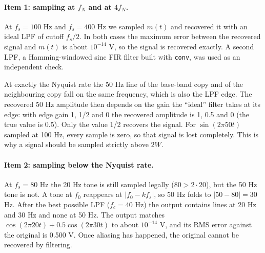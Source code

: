 \documentclass[a4paper]{article}
\begin{document}
\paragraph{Item 1: sampling at $f_N$ and at $4f_N$.}
At $f_s=100$ Hz and $f_s=400$ Hz we sampled $m(t)$ and recovered it with an ideal LPF of cutoff $f_s/2$. In both cases the maximum error between the recovered signal and $m(t)$ is about $10^{-14}$ V, so the signal is recovered exactly. A second LPF, a Hamming-windowed sinc FIR filter built with \texttt{conv}, was used as an independent check.


At exactly the Nyquist rate the 50 Hz line of the base-band copy and of the neighbouring copy fall on the same frequency, which is also the LPF edge. The recovered 50 Hz amplitude then depends on the gain the ``ideal'' filter takes at its edge: with edge gain 1, 1/2 and 0 the recovered amplitude is 1, 0.5 and 0 (the true value is 0.5). Only the value 1/2 recovers the signal. For $\sin(2\pi 50t)$ sampled at 100 Hz, every sample is zero, so that signal is lost completely. This is why a signal should be sampled strictly above $2W$.


\paragraph{Item 2: sampling below the Nyquist rate.}
At $f_s=80$ Hz the 20 Hz tone is still sampled legally ($80>2\cdot 20$), but the 50 Hz tone is not. A tone at $f_0$ reappears at $|f_0-kf_s|$, so 50 Hz folds to $|50-80|=30$ Hz. After the best possible LPF ($f_c=40$ Hz) the output contains lines at 20 Hz and 30 Hz and none at 50 Hz. The output matches $\cos(2\pi 20t)+0.5\cos(2\pi 30t)$ to about $10^{-14}$ V, and its RMS error against the original is 0.500 V. Once aliasing has happened, the original cannot be recovered by filtering.

\end{document}
